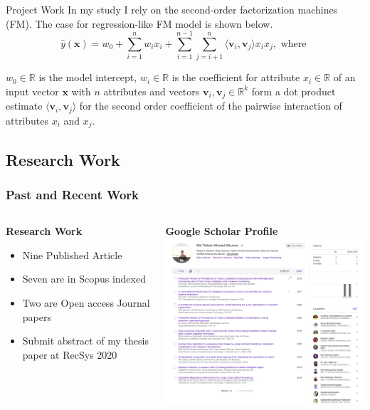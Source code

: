 \documentclass[smaller,aspectratio=169]{beamer}
\begin{document}
	\begin{frame}{Project Work}
In my study I rely on the second-order factorization machines (FM). The case for regression-like FM model is shown below. 	
$$\hat y(\mathbf x)=w_0+\sum_{i=1}^n w_i x_i + \sum_{i=1}^{n-1}\sum_{j=i+1}^{n} \langle \mathbf v_i, \mathbf v_j \rangle x_i x_j, \mbox{ where }$$

\noindent $w_0 \in \mathbb R$ is the model intercept, $w_i \in \mathbb R$ is the coefficient for attribute $x_i \in \mathbb R$ of an input vector $\mathbf{x}$ with $n$ attributes and vectors $\mathbf v_i, \mathbf v_j \in \mathbb{R}^k$ form a dot product estimate $\langle \mathbf v_i, \mathbf v_j \rangle$  for the second order coefficient of the pairwise interaction of attributes $x_i$ and $x_j$.
	    
	\end{frame}
	
	
	\subsection{Research Work}
	\begin{frame} %
		\frametitle{Past and Recent Work}
	
	
	\begin{columns}[T] %
    \begin{column}{.40\textwidth}
    \textbf{Research Work}
    \begin{itemize}
	    \item Nine Published Article
	    \item Seven are in Scopus indexed
	    \item Two are Open access Journal papers
	    \item Submit abstract of my thesis paper at RecSys 2020
	\end{itemize}
    \end{column}%
    \hfill%
    \begin{column}{.60\textwidth}
    \textbf{Google Scholar Profile}
    \includegraphics[width=8cm]{img/paper.png}
    \end{column}%
    \end{columns}
	\end{frame}
	
\end{document}
